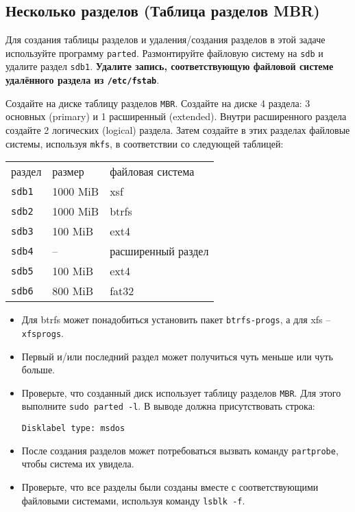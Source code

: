 \documentclass{article}
\begin{document}
\subsection{Несколько разделов (Таблица разделов MBR)}
Для создания таблицы разделов и удаления/создания разделов в этой задаче используйте программу \texttt{parted}. Размонтируйте файловую систему на \texttt{sdb} и удалите раздел \texttt{sdb1}. \textbf{Удалите запись, соответствующую файловой системе удалённого раздела из \texttt{/etc/fstab}}.

Создайте на диске таблицу разделов \texttt{MBR}. Создайте на диске 4 раздела: 3 основных (primary) и 1 расширенный (extended). Внутри расширенного раздела создайте 2 логических (logical) раздела. Затем создайте в этих разделах файловые системы, используя \texttt{mkfs}, в соответствии со следующей таблицей:
\begin{center}
\begin{tabular}{lll}
 раздел & размер  	& файловая система   \\
 \texttt{sdb1} 	& 1000 MiB 		& xsf   \\
 \texttt{sdb2} 	& 1000 MiB 		& btrfs \\
 \texttt{sdb3} 	& 100 MiB 	& ext4 \\
 \texttt{sdb4} 	& --	    & расширенный раздел \\
 \texttt{sdb5} 	& 100 MiB 	& ext4 \\
 \texttt{sdb6} 	& 800 MiB 	& fat32 \\
\end{tabular}
\end{center}

\begin{itemize}
\item Для btrfs может понадобиться установить пакет \texttt{btrfs-progs}, а для xfs -- \texttt{xfsprogs}.
\item Первый и/или последний раздел может получиться чуть меньше или чуть больше.
\item Проверьте, что созданный диск использует таблицу разделов \texttt{MBR}. Для этого выполните \texttt{sudo parted -l}. В выводе должна присутствовать строка:
\begin{lstlisting}
Disklabel type: msdos
\end{lstlisting}
\item После создания разделов может потребоваться вызвать команду \texttt{partprobe}, чтобы система их увидела.
\item Проверьте, что все разделы были созданы вместе с соответствующими файловыми системами, используя команду \texttt{lsblk -f}.
\end{itemize}
\end{document}
